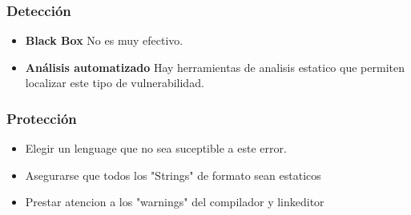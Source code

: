 \subsubsection{Detección}
\begin{itemize}
 \item \textbf{Black Box}
 	No es muy efectivo.
  \item \textbf{Análisis automatizado}
  	Hay herramientas de analisis estatico que permiten localizar este tipo de vulnerabilidad.
\end{itemize}


\subsubsection{Protección}
	
\begin{itemize}

	\item Elegir un lenguage que no sea suceptible a este error.

	\item Asegurarse que todos los "Strings" de formato sean estaticos
	
	\item Prestar atencion a los "warnings" del compilador y linkeditor
	
\end{itemize}
